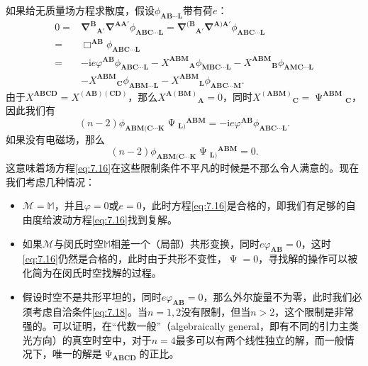如果给无质量场方程求散度，假设$\phi _{\boldsymbol{AB} \cdots \boldsymbol{L}}$带有荷$e$：
\begin{equation*}
	\begin{aligned}
		0= & \mathbf{\nabla }^{\boldsymbol{B}}{}_{\boldsymbol{A} '}\mathbf{\nabla }^{\boldsymbol{AA} '} \phi _{\boldsymbol{ABC} \cdots \boldsymbol{L}} =\mathbf{\nabla }^{(\boldsymbol{B}}{}_{\boldsymbol{A} '}\mathbf{\nabla }^{\boldsymbol{A})\boldsymbol{A} '} \phi _{\boldsymbol{ABC} \cdots \boldsymbol{L}}\\
		= & \Box ^{\boldsymbol{AB}} \phi _{\boldsymbol{ABC} \cdots \boldsymbol{L}}\\
		= & -\mathrm{i} e\varphi ^{\boldsymbol{AB}} \phi _{\boldsymbol{ABC} \cdots \boldsymbol{L}} -X^{\boldsymbol{ABM}}{}_{\boldsymbol{A}} \phi _{\boldsymbol{MBC} \cdots \boldsymbol{L}} -X^{\boldsymbol{ABM}}{}_{\boldsymbol{B}} \phi _{\boldsymbol{AMC} \cdots \boldsymbol{L}}\\
		& -X^{\boldsymbol{ABM}}{}_{\boldsymbol{C}} \phi _{\boldsymbol{ABM} \cdots \boldsymbol{L}} -X^{\boldsymbol{ABM}}{}_{\boldsymbol{L}} \phi _{\boldsymbol{ABC} \cdots \boldsymbol{M}} .
	\end{aligned}
\end{equation*}
由于$X^{\boldsymbol{ABCD}} = X^{(\boldsymbol{AB})(\boldsymbol{CD})}$，那么$X^{\boldsymbol{A}(\boldsymbol{BM})}{}_{\boldsymbol{A}} =0$，同时$X^{(\boldsymbol{ABM})}{}_{\boldsymbol{C}} =\upPsi ^{\boldsymbol{ABM}}{}_{\boldsymbol{C}}$，因此我们有
\begin{equation}
	( n-2) \phi _{\boldsymbol{ABM}(\boldsymbol{C} \cdots \boldsymbol{K}} \upPsi {_{\boldsymbol{L})}}^{\boldsymbol{ABM}} =-\mathrm{i} e\varphi ^{\boldsymbol{AB}} \phi _{\boldsymbol{ABC} \cdots \boldsymbol{L}} .
	\label{eq:7.17}
\end{equation}
如果没有电磁场，那么
\begin{equation}
	( n-2) \phi _{\boldsymbol{ABM}(\boldsymbol{C} \cdots \boldsymbol{K}} \upPsi {_{\boldsymbol{L})}}^{\boldsymbol{ABM}} =0.
	\label{eq:7.18}
\end{equation}
这意味着场方程\ref{eq:7.16}在这些限制条件不平凡的时候是不那么令人满意的。现在我们考虑几种情况：
\begin{itemize}
	\item $\mathcal{M} =\mathbb{M}$，并且$\varphi =0$或$e=0$，此时方程\ref{eq:7.16}是合格的，即我们有足够的自由度给波动方程\ref{eq:7.16}找到复解。
	\item 如果$\mathcal{M}$与闵氏时空$\mathbb{M}$相差一个（局部）共形变换，同时$e\varphi _{\boldsymbol{AB}} =0$，这时\ref{eq:7.16}仍然是合格的，此时由于共形不变性，$\upPsi =0$，寻找解的操作可以被化简为在闵氏时空找解的过程。
	\item 假设时空不是共形平坦的，同时$e\varphi _{\boldsymbol{AB}} =0$，那么外尔旋量不为零，此时我们必须考虑自洽条件\ref{eq:7.18}。当$n=1,2$没有限制，但当$n >2$，这个限制是非常强的。可以证明，在“代数一般”（algebraically general，即有不同的引力主类光方向）的真空时空中，对于$n=4$最多可以有两个线性独立的解，而一般情况下，唯一的解是$\upPsi _{\boldsymbol{ABCD}}$的正比。
\end{itemize}




